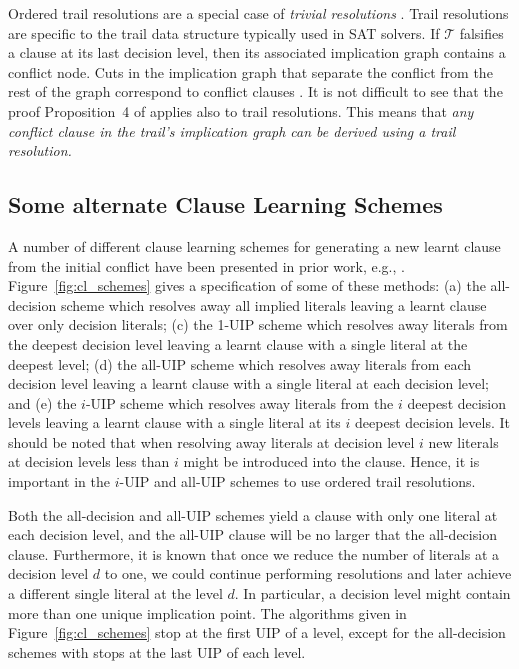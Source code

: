 \documentclass[runningheads]{llncs}
\newcommand{\sat}{SAT\xspace}
\newcommand{\trail}{\ensuremath{\mathcal{T}}}
\begin{document}
Ordered trail resolutions are a special case of \textit{trivial
  resolutions} \cite{DBLP:journals/jair/BeameKS04}. Trail resolutions
are specific to the trail data structure typically used in \sat
solvers. If $\trail$ falsifies a clause at its last decision level,
then its associated implication graph
\cite{DBLP:journals/tc/Marques-SilvaS99} contains a conflict
node. Cuts in the implication graph that separate the conflict from
the rest of the graph correspond to conflict clauses
\cite{DBLP:journals/jair/BeameKS04}. It is not difficult to see that
the proof Proposition~4 of \cite{DBLP:journals/jair/BeameKS04} applies
also to trail resolutions. This means that \textit{any conflict clause
  in the trail's implication graph can be derived using a trail
  resolution.}

\subsection{Some alternate Clause Learning Schemes}
A number of different clause learning schemes for generating a new
learnt clause from the initial conflict have been presented in prior
work, e.g.,
\cite{DBLP:conf/iccad/ZhangMMM01,DBLP:conf/iccad/SilvaS96,DBLP:journals/tc/Marques-SilvaS99,DBLP:conf/aaai/BayardoS97}.
Figure~\ref{fig:cl_schemes} gives a specification of some of these
methods: (a) the all-decision scheme which resolves away all implied
literals leaving a learnt clause over only decision literals; (c) the
1-UIP scheme which resolves away literals from the deepest decision
level leaving a learnt clause with a single literal at the deepest
level; (d) the all-UIP scheme which resolves away literals from each
decision level leaving a learnt clause with a single literal at each
decision level; and (e) the $i$-UIP scheme which resolves away
literals from the $i$ deepest decision levels leaving a learnt clause
with a single literal at its $i$ deepest decision levels. It should be
noted that when resolving away literals at decision level $i$ new
literals at decision levels less than $i$ might be introduced into the
clause. Hence, it is important in the $i$-UIP and all-UIP schemes to
use ordered trail resolutions.

Both the all-decision and all-UIP schemes yield a clause with only one
literal at each decision level, and the all-UIP clause will be no
larger that the all-decision clause. Furthermore, it is known
\cite{DBLP:journals/tc/Marques-SilvaS99} that once we reduce the
number of literals at a decision level $d$ to one, we could continue
performing resolutions and later achieve a different single literal at
the level $d$. In particular, a decision level might contain more than
one unique implication point. The algorithms given in
Figure~\ref{fig:cl_schemes} stop at the first UIP of a level, except
for the all-decision schemes with stops at the last UIP of each level.
\end{document}
